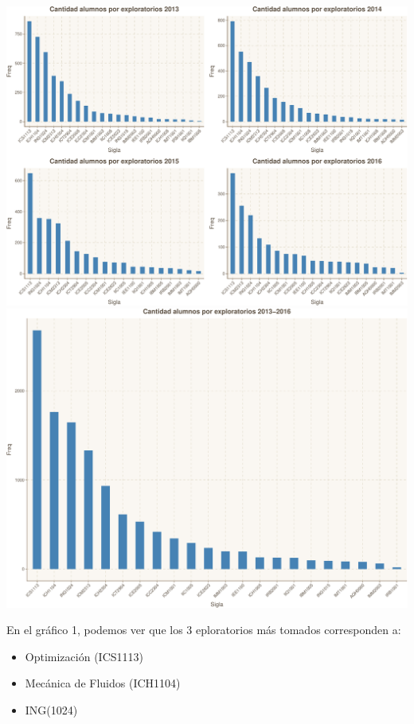 \documentclass[]{article}
\providecommand{\tightlist}{%
  \setlength{\itemsep}{0pt}\setlength{\parskip}{0pt}}
\begin{document}
\begin{center}\includegraphics{Figs/plot-1} \includegraphics{Figs/plot-2} \end{center}

En el gráfico 1, podemos ver que los 3 eploratorios más tomados
corresponden a:

\begin{itemize}
\tightlist
\item
  Optimización (ICS1113)\\
\item
  Mecánica de Fluidos (ICH1104)\\
\item
  ING(1024)
\end{itemize}
\end{document}

